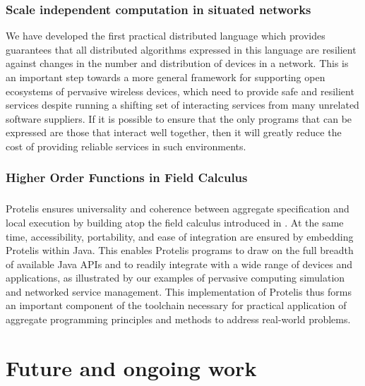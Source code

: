 \documentclass[12pt,a4paper,twoside,openright]{book}
\begin{document}


\subsection{Scale independent computation in situated networks}
We have developed the first practical distributed language which provides guarantees that all distributed algorithms expressed in this language are resilient against changes in the number and distribution of devices in a network.
%
This is an important step towards a more general framework for supporting open ecosystems of pervasive wireless devices, which need to provide safe and resilient services despite running a shifting set of interacting services from many unrelated software suppliers.
%
If it is possible to ensure that the only programs that can be expressed are those that interact well together, then it will greatly reduce the cost of providing reliable services in such environments.

\subsection{Higher Order Functions in Field Calculus}

\subsection{\protelis{}}
Protelis ensures universality and coherence between aggregate specification and local execution by building atop the field calculus introduced in \cite{VDB-FOCLASA-CIC2013}.
%
At the same time, accessibility, portability, and ease of integration are ensured by embedding Protelis within Java.
%
This enables Protelis programs to draw on the full breadth of available Java APIs and to readily integrate with a wide range of devices and applications, as illustrated by our examples of pervasive computing simulation and networked service management.
%
This implementation of Protelis thus forms an important component of the toolchain necessary for practical application of aggregate programming principles and methods to address real-world problems.
%



\chapter{Future and ongoing work}
\end{document}
